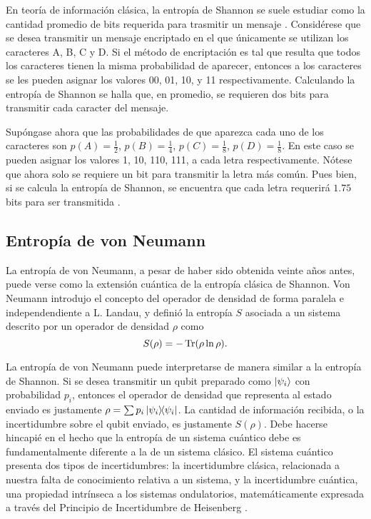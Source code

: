 En teoría de información clásica, la entropía de Shannon se suele estudiar como la cantidad promedio de bits requerida para trasmitir un mensaje . Considérese que se desea transmitir un mensaje encriptado en el que únicamente se utilizan los caracteres A, B, C y D. Si el método de encriptación es tal que resulta que todos los caracteres tienen la misma probabilidad de aparecer, entonces a los caracteres se les pueden asignar los valores 00, 01, 10, y 11 respectivamente. Calculando la entropía de Shannon se halla que, en promedio, se requieren dos bits para transmitir cada caracter del mensaje. 

Supóngase ahora que las probabilidades de que aparezca cada uno de los caracteres son $p(A)=\frac{1}{2}$, $p(B)=\frac{1}{4}$, $p(C)=\frac{1}{8}$, $p(D)=\frac{1}{8}$. En este caso se pueden asignar los valores 1, 10, 110, 111, a cada letra respectivamente. Nótese que ahora solo se requiere un bit para transmitir la letra más común. Pues bien, si se calcula la entropía de Shannon, se encuentra que cada letra requerirá $1.75$ bits para ser transmitida \cite{Chuang}.

\subsection{Entropía de von Neumann}

La entropía de von Neumann, a pesar de haber sido obtenida veinte años antes, puede verse como la extensión cuántica de la entropía clásica de Shannon. Von Neumann introdujo el concepto del operador de densidad de forma paralela e independendiente a L. Landau, y definió la entropía $S$ asociada a un sistema descrito por un operador de densidad $\rho$ como \cite{vonNeumann}
\begin{equation}\label{eq:VonNeumannEntropy}
    S(\rho)=-\Tr(\rho\ln{\rho}).
\end{equation}

La entropía de von Neumann puede interpretarse de manera similar a la entropía de Shannon. Si se desea transmitir un qubit preparado como $\ket{\psi_{i}}$ con probabilidad $p_{i}$, entonces el operador de densidad que representa al estado enviado es justamente $\rho=\sum p_{i}\dyad{\psi_{i}}$. La cantidad de información recibida, o la incertidumbre sobre el qubit enviado, es justamente $S(\rho)$. Debe hacerse hincapié en el hecho que la entropía de un sistema cuántico debe es fundamentalmente diferente a la de un sistema clásico. El sistema cuántico presenta dos tipos de incertidumbres: la incertidumbre clásica, relacionada a nuestra falta de conocimiento relativa a un sistema, y la incertidumbre cuántica, una propiedad intrínseca a los sistemas ondulatorios, matemáticamente expresada a través del Principio de Incertidumbre de Heisenberg \cite{Wilde}.

